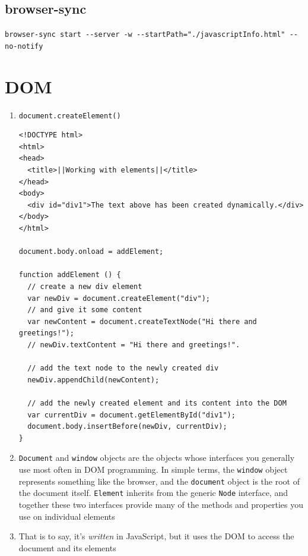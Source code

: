 \documentclass[a4paper, 12pt]{article}
\begin{document}
\subsection{browser-sync}
\verb|browser-sync start --server -w --startPath="./javascriptInfo.html" --no-notify|

\section{DOM}
\begin{enumerate}

\item \verb|document.createElement()|
\begin{verbatim}
<!DOCTYPE html>
<html>
<head>
  <title>||Working with elements||</title>
</head>
<body>
  <div id="div1">The text above has been created dynamically.</div>
</body>
</html>

document.body.onload = addElement;

function addElement () { 
  // create a new div element 
  var newDiv = document.createElement("div"); 
  // and give it some content 
  var newContent = document.createTextNode("Hi there and greetings!"); 
  // newDiv.textContent = "Hi there and greetings!".
  
  // add the text node to the newly created div
  newDiv.appendChild(newContent);  

  // add the newly created element and its content into the DOM 
  var currentDiv = document.getElementById("div1"); 
  document.body.insertBefore(newDiv, currentDiv); 
}
\end{verbatim}

\item \verb|Document| and \verb|window| objects are the objects whose interfaces you generally use most often in DOM programming. In simple terms, the \verb|window| object represents something like the browser, and the \verb|document| object is the root of the document itself. \verb|Element| inherits from the generic \verb|Node| interface, and together these two interfaces provide many of the methods and properties you use on individual elements

\item That is to say, it's \textit{written} in JavaScript, but it uses the DOM to access the document and its elements
\end{enumerate}
\end{document}
